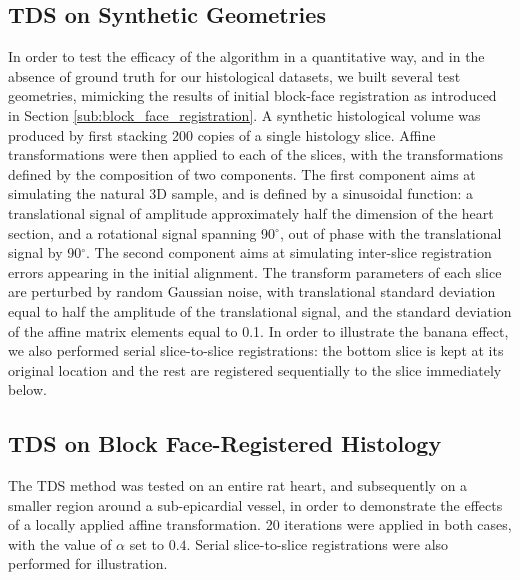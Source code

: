   \subsection{TDS on Synthetic Geometries} %
    \label{sub:tds_on_synthetic_geometries}
    In order to test the efficacy of the algorithm in a quantitative way, and in the absence of ground truth for our histological datasets, we built several test geometries, mimicking the results of initial block-face registration as introduced in Section \ref{sub:block_face_registration}. A synthetic histological volume was produced by first stacking 200 copies of a single histology slice. Affine transformations were then applied to each of the slices, with the transformations defined by the composition of two components. The first component aims at simulating the natural 3D sample, and is defined by a sinusoidal function: a translational signal of amplitude approximately half the dimension of the heart section, and a rotational signal spanning 90$^{\circ}$, out of phase with the translational signal by 90$^{\circ}$. The second component aims at simulating inter-slice registration errors appearing in the initial alignment. The transform parameters of each slice are perturbed by random Gaussian noise, with translational standard deviation equal to half the amplitude of the translational signal, and the standard deviation of the affine matrix elements equal to 0.1. In order to illustrate the banana effect, we also performed serial slice-to-slice registrations: the bottom slice is kept at its original location and the rest are registered sequentially to the slice immediately below.
  
  \subsection{TDS on Block Face-Registered Histology} %
    \label{sub:diffusion_on_block_face_registered_histology}
    The TDS method was tested on an entire rat heart, and subsequently on a smaller region around a sub-epicardial vessel, in order to demonstrate the effects of a locally applied affine transformation. 20 iterations were applied in both cases, with the value of $\alpha$ set to $0.4$. Serial slice-to-slice registrations were also performed for illustration.
